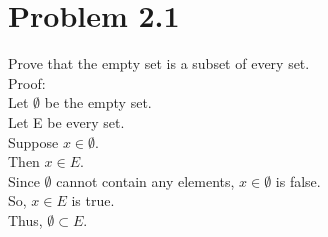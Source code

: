 \section{Problem 2.1}
Prove that the empty set is a subset of every set. 
\\
Proof:\\ 
Let $\emptyset$ be the empty set. \\ 
Let E be every set. \\ 
Suppose $x \in \emptyset.$ \\ 
Then $x \in E.$ \\ 
Since $\emptyset$ cannot contain any elements, $x \in \emptyset$ is false. \\ 
So, $x \in E$ is true. \\ 
Thus, $\emptyset \subset E.$
\\

\begin{figure}[h]\end{figure} 
\newpage
